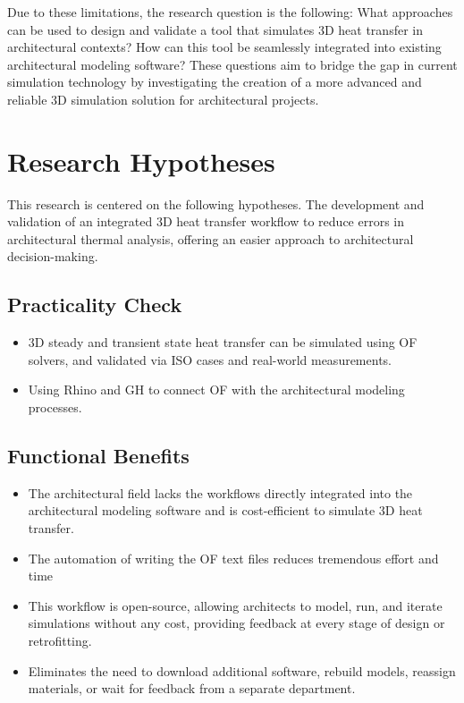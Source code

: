 Due to these limitations, the research question is the following: What approaches can be used to design and validate a tool that simulates 3D heat transfer in architectural contexts? How can this tool be seamlessly integrated into existing architectural modeling software? These questions aim to bridge the gap in current simulation technology by investigating the creation of a more advanced and reliable 3D simulation solution for architectural projects.

\section{Research Hypotheses}
This research is centered on the following hypotheses.
The development and validation of an integrated 3D heat transfer workflow to reduce errors in architectural thermal analysis, offering an easier approach to architectural decision-making.

\subsection{Practicality Check}
\begin{itemize}
    \item 3D steady and transient state heat transfer can be simulated using \gls{OF} solvers, and validated via ISO cases and real-world measurements.
    \item Using Rhino and \gls{GH} to connect \gls{OF} with the architectural modeling processes. 
\end{itemize}

\subsection{Functional Benefits}
\begin{itemize}
    \item The architectural field lacks the workflows directly integrated into the architectural modeling software and is cost-efficient to simulate 3D heat transfer.
    \item The automation of writing the OF text files reduces tremendous effort and time
    \item This workflow is open-source, allowing architects to model, run, and iterate simulations without any cost, providing feedback at every stage of design or retrofitting.

    \item Eliminates the need to download additional software, rebuild models, reassign materials, or wait for feedback from a separate department.
\end{itemize}


